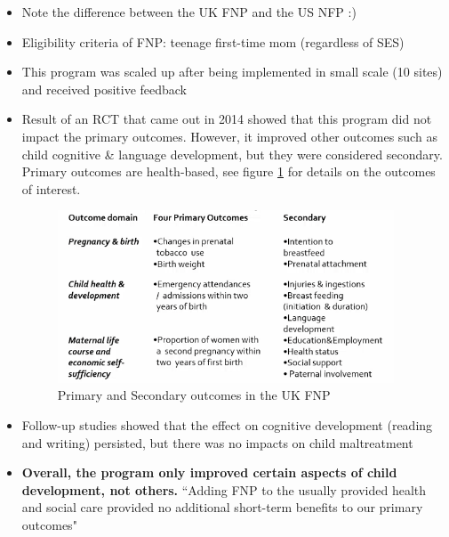             \begin{itemize}
                \item Note the difference between the UK FNP and the US NFP :)
                \item Eligibility criteria of FNP: teenage first-time mom (regardless of SES)
                \item This program was scaled up after being implemented in small scale (10 sites) and received positive feedback
                \item Result of an RCT that came out in 2014 showed that this program did not impact the primary outcomes. However, it improved other outcomes such as child cognitive \& language development, but they were considered secondary. Primary outcomes are health-based, see figure \ref{FNPgoal} for details on the outcomes of interest.
                \begin{figure}[H]%
                \centering
                \includegraphics[width=10cm]{images/ch4/OutcomesInterest_FNP.png}
                \caption{Primary and Secondary outcomes in the UK FNP}
                \label{FNPgoal}
                \end{figure}
                \item Follow-up studies showed that the effect on cognitive development (reading and writing) persisted, but there was no impacts on child maltreatment
                \item \textbf{Overall, the program only improved certain aspects of child development, not others.} ``Adding FNP to the usually provided health and social care provided no additional short-term benefits to our primary outcomes"
            \end{itemize}
        
